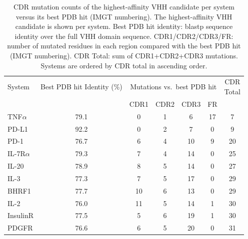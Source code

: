 \documentclass[11pt]{article}
\begin{document}
\begin{table}[!htbp]
\centering
\begin{tabular}{lc*{5}{c}}
\toprule
System & Best PDB hit Identity (\%) & \multicolumn{4}{c}{Mutations vs.\ best PDB hit} & \shortstack[c]{CDR\\Total}\\
\cmidrule(lr){3-6}
 & & CDR1 & CDR2 & CDR3 & FR & \\
\midrule
TNF$\alpha$    & 79.1 & 0  & 1 & 6  & 17 & 7\\
PD-L1       & 92.2 & 0  & 2 & 7  & 0  & 9\\
PD-1        & 76.7 & 6  & 4 & 10 & 9  & 20\\
IL-7R$\alpha$  & 79.3 & 7  & 4 & 14 & 0  & 25\\
IL-20       & 78.9 & 8  & 5 & 14 & 0  & 27\\
IL-3        & 77.3 & 7  & 5 & 17 & 0  & 29\\
BHRF1       & 77.7 & 10 & 6 & 13 & 0  & 29\\
IL-2        & 76.0 & 11 & 5 & 14 & 1  & 30\\
InsulinR    & 77.5 & 5  & 6 & 19 & 1  & 30\\
PDGFR       & 76.6 & 6  & 5 & 20 & 0  & 31\\
\bottomrule
\end{tabular}
\caption{CDR mutation counts of the highest-affinity VHH candidate per system versus its best PDB
hit (IMGT numbering). The highest-affinity VHH candidate is shown per system. Best PDB hit identity: blastp sequence identity over the full
VHH domain sequence. CDR1/CDR2/CDR3/FR: number of mutated residues in each region compared with the best
PDB hit (IMGT numbering). CDR Total: sum of CDR1+CDR2+CDR3 mutations. Systems are ordered by CDR total in
ascending order.}
\label{tab:cdr_besthit}
\end{table}
\end{document}
